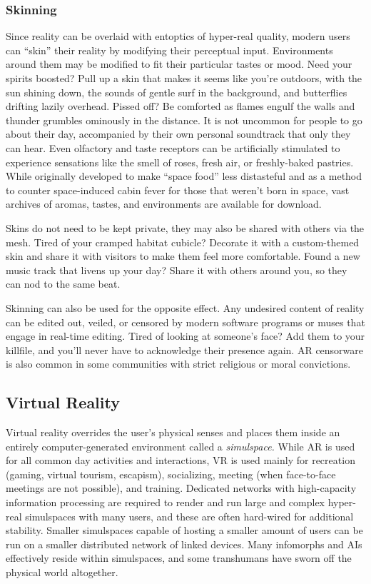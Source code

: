 \subsubsection{Skinning} 

Since reality can be overlaid with entoptics of hyper-real quality, modern users can ``skin'' their reality by modifying their perceptual input. Environments around them may be modified to fit their particular tastes or mood. Need your spirits boosted? Pull up a skin that makes it seems like you're outdoors, with the sun shining down, the sounds of gentle surf in the background, and butterflies drifting lazily overhead. Pissed off? Be comforted as flames engulf the walls and thunder grumbles ominously in the distance. It is not uncommon for people to go about their day, accompanied by their own personal soundtrack that only they can hear. Even olfactory and taste receptors can be artificially stimulated to experience sensations like the smell of roses, fresh air, or freshly-baked pastries. While originally developed to make ``space food'' less distasteful and as a method to counter space-induced cabin fever for those that weren't born in space, vast archives of aromas, tastes, and environments are available for download. 

Skins do not need to be kept private, they may also be shared with others via the mesh. Tired of your cramped habitat cubicle? Decorate it with a custom-themed skin and share it with visitors to make them feel more comfortable. Found a new music track that livens up your day? Share it with others around you, so they can nod to the same beat. 

Skinning can also be used for the opposite effect. Any undesired content of reality can be edited out, veiled, or censored by modern software programs or muses that engage in real-time editing. Tired of looking at someone's face? Add them to your killfile, and you'll never have to acknowledge their presence again. AR censorware is also common in some communities with strict religious or moral convictions. 

\subsection{Virtual Reality} 

Virtual reality overrides the user's physical senses and places them inside an entirely computer-generated environment called a \textit{simulspace.} While AR is used for all common day activities and interactions, VR is used mainly for recreation (gaming, virtual tourism, escapism), socializing, meeting (when face-to-face meetings are not possible), and training. Dedicated networks with high-capacity information processing are required to render and run large and complex hyper-real simulspaces with many users, and these are often hard-wired for additional stability. Smaller simulspaces capable of hosting a smaller amount of users can be run on a smaller distributed network of linked devices. Many infomorphs and AIs effectively reside within simulspaces, and some transhumans have sworn off the physical world altogether. 




